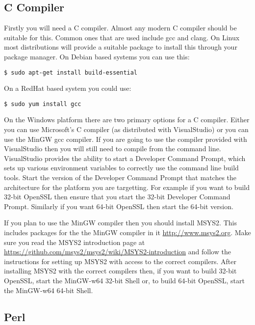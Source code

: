 \subsection{C Compiler}

Firstly you will need a C compiler. Almost any modern C compiler should be suitable for
this. Common ones that are used include gcc and clang. On Linux most distributions will
provide a suitable package to install this through your package manager. On Debian
based systems you can use this:


\begin{verbatim}
$ sudo apt-get install build-essential
\end{verbatim}

On a RedHat based system you could use:

\begin{verbatim}
$ sudo yum install gcc
\end{verbatim}

On the Windows platform there are two primary options for a C compiler. Either you can
use Microsoft's C compiler (as distributed with VisualStudio) or you can use the MinGW
gcc compiler. If you are going to use the compiler provided with VisualStudio then you
will still need to compile from the command line. VisualStudio provides the ability to
start a Developer Command Prompt, which sets up various environment variables to
correctly use the command line build tools. Start the version of the Developer
Command Prompt that matches the architecture for the platform you are targetting. For
example if you want to build 32-bit OpenSSL then ensure that you start the 32-bit
Developer Command Prompt. Similarly if you want 64-bit OpenSSL then start the 64-bit
version.

If you plan to use the MinGW compiler then you should install MSYS2. This includes
packages for the the MinGW compiler in it \url{http://www.msys2.org}. Make sure you read the
MSYS2 introduction page at \url{https://github.com/msys2/msys2/wiki/MSYS2-introduction}
and follow the instructions for setting up MSYS2 with access to the correct compilers.
After installing MSYS2 with the correct compilers then, if you want to build 32-bit
OpenSSL, start the MinGW-w64 32-bit Shell or, to build 64-bit OpenSSL, start the
MinGW-w64 64-bit Shell.

\subsection{Perl} \label{sec:getting-prereq-perl}

